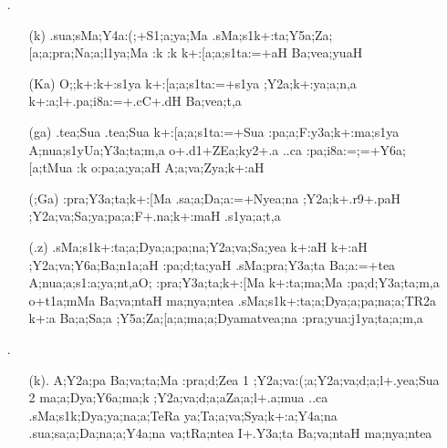 \begin{spacing}{1.15}
\begin{itemize}
\item[{\sktf 11}.] \begin{itemize}
        \item[({\sktf k})] {\sktf .sua;sMa;Y4a:(;+S1;a;ya;Ma
.sMa;s1k+:ta;Y5a;Za;[a;a;pra;Na;a;l1ya;Ma :k
:k k+:[a;a;s1ta:=+aH Ba;vea;yuaH}
           
           \item[({\sktf Ka})] {\sktf O;;k+:k+:s1ya
k+:[a;a;s1ta:=+s1ya ;Y2a;k+:ya;a;n,a k+:a;l+.pa;i8a:=+.cC+.dH
Ba;vea;t,a}
            
           \item[({\sktf ga})] {\sktf .tea;Sua .tea;Sua
k+:[a;a;s1ta:=+Sua :pa;a;F:y3a;k+:ma;s1ya
A;nua;s1yUa;Y3a;ta;m,a o+.d1+ZEa;ky2+.a ..ca
:pa;i8a:=;=+Y6a;[a;tMua {:k} o:pa;a{;ya;aH} A;a{;va};Zya;k+:aH}
           
           \item[({\sktf ;Ga})] {\sktf :pra;Y3a;ta;k+:[Ma .sa;a;Da;a:=+Nyea;na
;Y2a;k+.r9+.paH ;Y2a;va;Sa;ya;pa;a;F+.na;k+:maH
.s1ya;a;t,a} 
           
           \item[({\sktf .z})] {\sktf .sMa;s1k+:ta;a;Dya;a;pa;na;Y2a;va;Sa;yea k+:aH k+:aH
;Y2a;va;Y6a;Ba;n1a;aH :pa;d;ta;yaH .sMa;pra;Y3a;ta
Ba;a:=+tea A;nua;a;s1:a;ya;nt,aO;  :pra;Y3a;ta;k+:[Ma k+:ta;ma;Ma :pa;d;Y3a;ta;m,a o+t1a;mMa
Ba;va;ntaH ma;nya;ntea  .sMa;s1k+:ta;a;Dya;a;pa;na;a;TR2a k+:a Ba;a;Sa;a {;Y5a;Za;[a;a;ma;a}{;Dya}{ma{tvea};na} :pra;yua:j1ya;ta;a;m,a }
           \end{itemize}

\item[{\sktf 12}.]\begin{itemize}
        \item[({\sktf k}).] {\sktf A;Y2a;pa Ba;va;ta;Ma :pra;d;Zea
\ZF{(}1\ZF{)} ;Y2a;va:(;a;Y2a;va;d;a;l+.yea;Sua
\ZF{(}2\ZF{)} ma;a;Dya;Y6a;ma;k ;Y2a;va;d;a;a\ZF{-}Za;a;l+.a;mua
..ca .sMa;s1k;Dya;ya;na;a;TeRa ya;Ta;a;va;Sya;k+:a;Y4a;na .sua;sa;a;Da;na;a;Y4a;na
va;tRa;ntea I+.Y3a;ta Ba;va;ntaH ma;nya;ntea}
                

\end{itemize}
\end{itemize}
\end{spacing}

